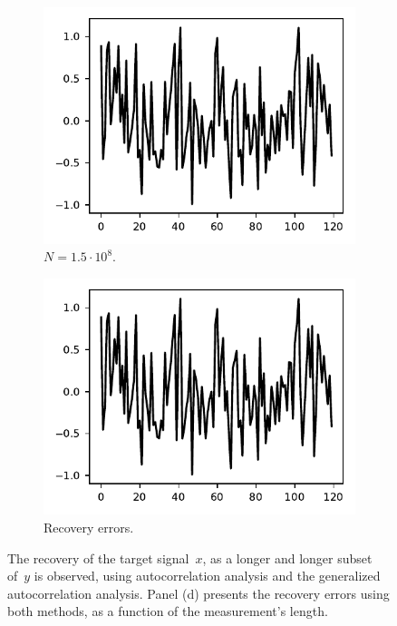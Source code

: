 \documentclass{article}
\begin{document}
\begin{figure}[!tb]
\begin{subfigure}[ht]{0.245\textwidth}
		\includegraphics[width=\columnwidth]{figures/y_SNR01.pdf}
		\caption{$N = 1.5 \cdot 10^8$.}
	\end{subfigure}
	\hfill
	\begin{subfigure}[ht]{0.245\textwidth}
		\centering
		\includegraphics[width=\columnwidth]{figures/y_SNR01.pdf}
		\caption{Recovery errors.}
	\end{subfigure}
	\caption{The recovery of the target signal~$x$, as a longer and longer subset of~$y$ is observed, using autocorrelation analysis and the generalized autocorrelation analysis. Panel (d) presents the recovery errors using both methods, as a function of the measurement's length.}
\label{fig:recoveries}
\end{figure}
\end{document}
